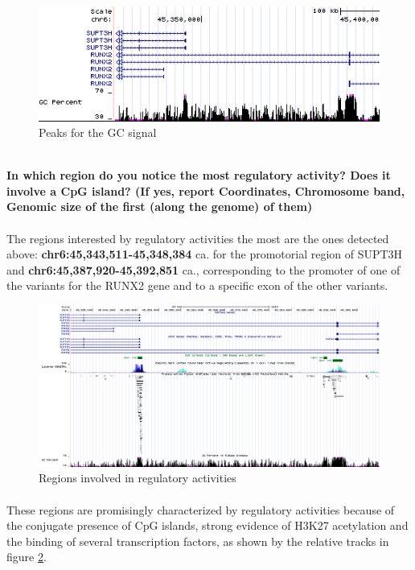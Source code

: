 \documentclass[12pt, a4paper]{article}
\begin{document}
\begin{figure}[h]
		\centering
		\includegraphics[width = .8\textwidth]{GC_peaks}
		\caption{Peaks for the GC signal}
		\label{GC peaks}
\end{figure}
	
\textbf{\\ In which region do you notice the most regulatory activity? Does it involve a CpG island? (If yes, report Coordinates, Chromosome band, Genomic size of the first (along the genome) of them)}%
\paragraph{}The regions interested by regulatory activities the most are the ones detected above: \textbf{chr6:45,343,511-45,348,384} ca. for the promotorial region of SUPT3H and \textbf{chr6:45,387,920-45,392,851} ca., corresponding to the promoter of one of the variants for the RUNX2 gene and to a specific exon of the other variants.

\begin{figure}[h]
	\centering
	\includegraphics[width = \textwidth]{regulatory_regions}
	\caption{Regions involved in regulatory activities}
	\label{regulatory regions}
\end{figure}

\paragraph{}These regions are promisingly characterized by regulatory activities because of the conjugate presence of CpG islands, strong evidence of H3K27 acetylation and the binding of several transcription factors, as shown by the relative tracks in figure \ref{regulatory regions}.
\end{document}
